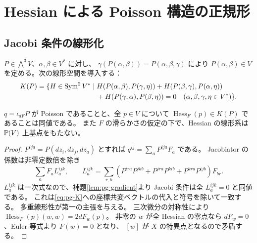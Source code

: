 \section{Hessian による Poisson 構造の正規形}\label{sec:pg-normal}
\subsection{Jacobi 条件の線形化}
$P\in\bigwedge^3V$、$\alpha,\beta\in V^*$ に対し、
$\gamma(P(\alpha,\beta))=P(\alpha,\beta,\gamma)$ により
$P(\alpha,\beta)\in V$ を定める。次の線形空間を導入する：
\begin{align}
K(P)=\{H\in\operatorname{Sym}^2V^*\mid{}
&H(P(\alpha,\beta),P(\gamma,\eta))
 +H(P(\beta,\gamma),P(\alpha,\eta))\notag\\
&+H(P(\gamma,\alpha),P(\beta,\eta))=0
\quad(\alpha,\beta,\gamma,\eta\in V^*)\}.\label{eq:pg-K}
\end{align}
\begin{lemma}\label{lem:pg-linearize}
$q=\iota_{dF}P$ が Poisson であることと、全 $p\in V$ について
$\operatorname{Hess}_F(p)\in K(P)$ であることは同値である。
また $F$ の滑らかさの仮定の下で、Hessian の線形系は $\mathbb P(V)$ 上基点をもたない。
\end{lemma}
\begin{proof}
$P^{ija}=P(dz_i,dz_j,dz_a)$ とすれば $q^{ij}=\sum_aP^{ija}F_a$ である。
Jacobiator の係数は非零定数倍を除き
\[
\sum_aF_aL_a^{ijk},\qquad
L_a^{ijk}=\sum_{r,b}(P^{ira}P^{jkb}+P^{jra}P^{kib}+P^{kra}P^{ijb})F_{br}.
\]
$L_a^{ijk}$ は一次式なので、補題\ref{lem:pg-gradient}より
Jacobi 条件は全 $L_a^{ijk}=0$ と同値である。
これは\eqref{eq:pg-K}への座標共変ベクトルの代入と符号を除いて一致する。
多重線形性が第一の主張を与える。
三次微分の対称性により
$\operatorname{Hess}_F(p)(w,w)=2dF_w(p)$。
非零の $w$ が全 Hessian の零点なら $dF_w=0$、Euler 等式より $F(w)=0$ となり、
$[w]$ が $X$ の特異点となるので矛盾する。
\end{proof}


